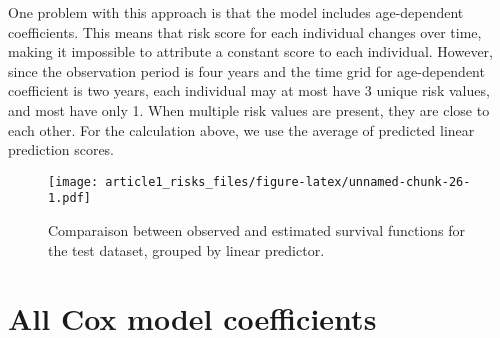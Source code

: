 \documentclass[risks,article,submit,moreauthors,pdftex]{Definitions/mdpi}
\begin{document}
One problem with this approach is that the model includes age-dependent
coefficients. This means that risk score for each individual changes
over time, making it impossible to attribute a constant score to each
individual. However, since the observation period is four years and the
time grid for age-dependent coefficient is two years, each individual
may at most have 3 unique risk values, and most have only 1. When
multiple risk values are present, they are close to each other. For the
calculation above, we use the average of predicted linear prediction
scores.

\begin{figure}
\centering
\texttt{[image: article1\_risks\_files/figure-latex/unnamed-chunk-26-1.pdf]}
\caption{\label{fig:compare_surv_test_risk_group} Comparaison between
observed and estimated survival functions for the test dataset, grouped
by linear predictor.}
\end{figure}

\newpage

\hypertarget{all-cox-model-coefficients}{%
\section{All Cox model coefficients}\label{all-cox-model-coefficients}}
\end{document}

